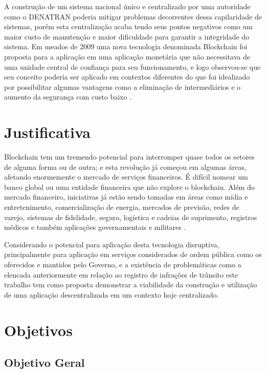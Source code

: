 A construção de um sistema nacional único e centralizado por uma autoridade como o DENATRAN poderia mitigar problemas decorrentes dessa capilaridade de sistemas, porém esta centralização acaba tendo seus pontos negativos como um maior custo de manutenção e maior dificuldade para garantir a integridade do sistema. Em meados de 2009 uma nova tecnologia denominada Blockchain foi proposta para a aplicação em uma aplicação monetária que não necessitava de uma unidade central de confiança para seu funcionamento, e logo observou-se que seu conceito poderia ser aplicado em contextos diferentes do que foi idealizado por possibilitar algumas vantagens como a eliminação de intermediários e o aumento da segurança com custo baixo \cite{beginnig_blockchain_bikramaditya}.


\section{Justificativa}

Blockchain tem um tremendo potencial para interromper quase todos os setores de alguma forma ou de outra; e esta revolução já começou em algumas áreas, afetando enormemente o mercado de serviços financeiros. É difícil nomear um banco global ou uma entidade financeira que não explore o blockchain. Além do mercado financeiro, iniciativas já estão sendo tomadas em áreas como mídia e entretenimento, comercialização de energia, mercados de previsão, redes de varejo, sistemas de fidelidade, seguro, logística e cadeias de suprimento, registros médicos e também aplicações governamentais e militares \cite{beginnig_blockchain_bikramaditya}.

Considerando o potencial para aplicação desta tecnologia disruptiva, principalmente para aplicação em serviços considerados de ordem pública como os oferecidos e mantidos pelo Governo, e a existência de problemáticas como a elencada anteriormente em relação ao registro de infrações de trânsito este trabalho tem como proposta demonstrar a viabilidade da construção e utilização de uma aplicação descentralizada em um contexto hoje centralizado.

\section{Objetivos}

    \subsection{Objetivo Geral}
    
